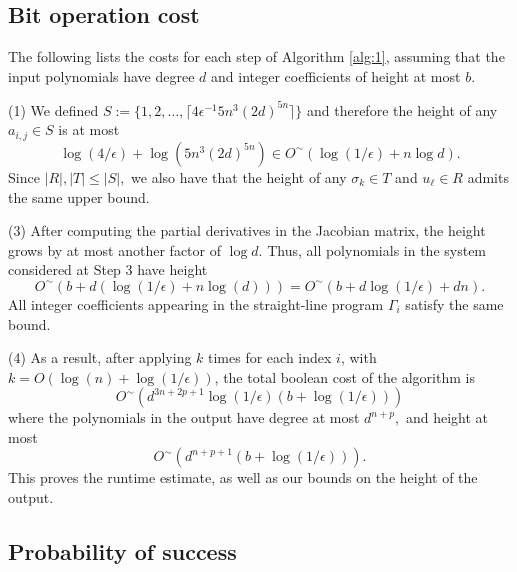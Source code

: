 \documentclass[12pt]{article}
\begin{document}

\subsection{Bit operation cost} 

The following lists the costs for each step of Algorithm \ref{alg:1},
assuming that the input polynomials have degree $d$ and integer
coefficients of height at most $b$.

\smallskip\noindent
(1) We defined $S := \{1,2,\hdots,\lceil 4\epsilon^{-1}5n^3(2d)^{5n} \rceil \}$
and therefore the height of any $a_{i,j} \in S$ is at most
\[
\log (4/{\epsilon}) + \log(5n^3(2d)^{5n}) \in O^{\sim}(\log (1/{\epsilon}) + n\log d).
\]
Since $|R|, |T| \le |S|,$ we also have that the height of any
$\sigma_{k} \in T$ and $u_{\ell} \in R$ admits the same upper bound.

\smallskip\noindent (3) After computing the partial derivatives in the
Jacobian matrix, the height grows by at most another factor of $\log
d$. Thus, all polynomials in the system considered at Step 3 have
height
\[
O^{\sim}(b + d(\log (1/\epsilon) + n\log(d)))
=
O^{\sim}(b + d\log (1/\epsilon) + dn).
\]
All integer coefficients appearing in the straight-line program
$\Gamma_i$ satisfy the same bound.

\smallskip\noindent (4) As a result, after applying \cite[Algorithm
  2]{SH} $k$ times for each index $i$, with $k = O(\log(n) + \log( 1 /\epsilon))$, the total boolean cost of the algorithm is
  \[
O^{\sim}(d^{3n+2p+1}\log(1/\epsilon)(b + \log(1/\epsilon)))
  \]
      where the polynomials in the output have degree at most $d^{n+p},$ and height at most
  \[
O^{\sim}(d^{n+p+1}(b + \log(1/\epsilon))).
  \]
This proves the runtime estimate, as well as our bounds on the height
of the output.


\subsection{Probability of success} 
\end{document}
